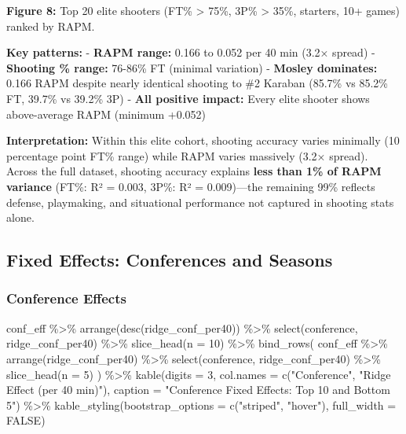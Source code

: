 \documentclass[
  letterpaper,
  DIV=11,
  numbers=noendperiod]{scrartcl}
\newenvironment{Shaded}{\begin{snugshade}}{\end{snugshade}}
\newcommand{\AttributeTok}[1]{\textcolor[rgb]{0.40,0.45,0.13}{#1}}
\newcommand{\ConstantTok}[1]{\textcolor[rgb]{0.56,0.35,0.01}{#1}}
\newcommand{\DecValTok}[1]{\textcolor[rgb]{0.68,0.00,0.00}{#1}}
\newcommand{\FunctionTok}[1]{\textcolor[rgb]{0.28,0.35,0.67}{#1}}
\newcommand{\NormalTok}[1]{\textcolor[rgb]{0.00,0.23,0.31}{#1}}
\newcommand{\SpecialCharTok}[1]{\textcolor[rgb]{0.37,0.37,0.37}{#1}}
\newcommand{\StringTok}[1]{\textcolor[rgb]{0.13,0.47,0.30}{#1}}
\begin{document}
\textbf{Figure 8:} Top 20 elite shooters (FT\% \textgreater{} 75\%, 3P\%
\textgreater{} 35\%, starters, 10+ games) ranked by RAPM.

\textbf{Key patterns:} - \textbf{RAPM range:} 0.166 to 0.052 per 40 min
(3.2× spread) - \textbf{Shooting \% range:} 76-86\% FT (minimal
variation) - \textbf{Mosley dominates:} 0.166 RAPM despite nearly
identical shooting to \#2 Karaban (85.7\% vs 85.2\% FT, 39.7\% vs 39.2\%
3P) - \textbf{All positive impact:} Every elite shooter shows
above-average RAPM (minimum +0.052)

\textbf{Interpretation:} Within this elite cohort, shooting accuracy
varies minimally (10 percentage point FT\% range) while RAPM varies
massively (3.2× spread). Across the full dataset, shooting accuracy
explains \textbf{less than 1\% of RAPM variance} (FT\%: R² = 0.003,
3P\%: R² = 0.009)---the remaining 99\% reflects defense, playmaking, and
situational performance not captured in shooting stats alone.

\subsection{Fixed Effects: Conferences and
Seasons}\label{fixed-effects-conferences-and-seasons}

\subsubsection{Conference Effects}\label{conference-effects}

\begin{Shaded}
\begin{Highlighting}[]
\NormalTok{conf\_eff }\SpecialCharTok{\%\textgreater{}\%}
  \FunctionTok{arrange}\NormalTok{(}\FunctionTok{desc}\NormalTok{(ridge\_conf\_per40)) }\SpecialCharTok{\%\textgreater{}\%}
  \FunctionTok{select}\NormalTok{(conference, ridge\_conf\_per40) }\SpecialCharTok{\%\textgreater{}\%}
  \FunctionTok{slice\_head}\NormalTok{(}\AttributeTok{n =} \DecValTok{10}\NormalTok{) }\SpecialCharTok{\%\textgreater{}\%}
  \FunctionTok{bind\_rows}\NormalTok{(}
\NormalTok{    conf\_eff }\SpecialCharTok{\%\textgreater{}\%}
      \FunctionTok{arrange}\NormalTok{(ridge\_conf\_per40) }\SpecialCharTok{\%\textgreater{}\%}
      \FunctionTok{select}\NormalTok{(conference, ridge\_conf\_per40) }\SpecialCharTok{\%\textgreater{}\%}
      \FunctionTok{slice\_head}\NormalTok{(}\AttributeTok{n =} \DecValTok{5}\NormalTok{)}
\NormalTok{  ) }\SpecialCharTok{\%\textgreater{}\%}
  \FunctionTok{kable}\NormalTok{(}\AttributeTok{digits =} \DecValTok{3}\NormalTok{,}
        \AttributeTok{col.names =} \FunctionTok{c}\NormalTok{(}\StringTok{"Conference"}\NormalTok{, }\StringTok{"Ridge Effect (per 40 min)"}\NormalTok{),}
        \AttributeTok{caption =} \StringTok{"Conference Fixed Effects: Top 10 and Bottom 5"}\NormalTok{) }\SpecialCharTok{\%\textgreater{}\%}
  \FunctionTok{kable\_styling}\NormalTok{(}\AttributeTok{bootstrap\_options =} \FunctionTok{c}\NormalTok{(}\StringTok{"striped"}\NormalTok{, }\StringTok{"hover"}\NormalTok{), }\AttributeTok{full\_width =} \ConstantTok{FALSE}\NormalTok{)}
\end{Highlighting}
\end{Shaded}
\end{document}
